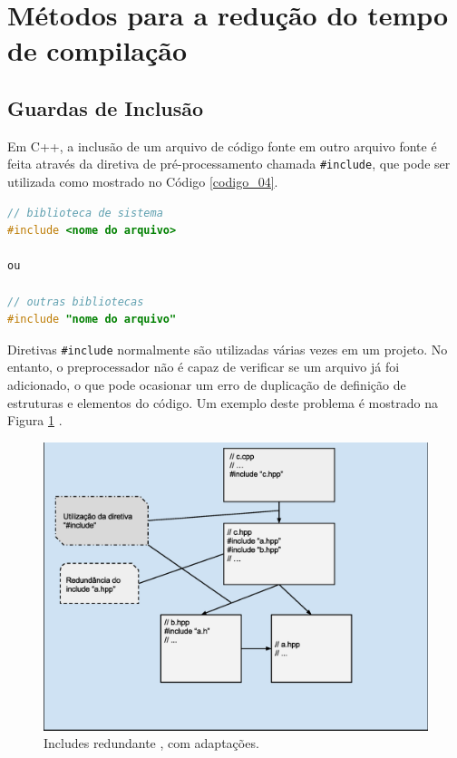 \section{Métodos para a redução do tempo de compilação}

\subsection{Guardas de Inclusão}\label{include_guards_section}

Em C++, a inclusão de um arquivo de código fonte em outro arquivo fonte é feita
 através da diretiva de pré-processamento chamada \texttt{\#include}, que pode 
ser utilizada como mostrado no Código \ref{codigo_04}. 

\begin{lstlisting}[language=C++,caption={Diretiva de 
                           pré-processamento para inclusão de arquivo},
                                                   label=codigo_04]
// biblioteca de sistema 
#include <nome do arquivo>  

ou

// outras bibliotecas 
#include "nome do arquivo"  

\end{lstlisting}


Diretivas \texttt{\#include} normalmente são utilizadas várias vezes em um projeto.
 No entanto, o preprocessador não é capaz de verificar se um arquivo já foi
 adicionado, o que pode ocasionar um erro de duplicação de definição de
 estruturas e elementos do código. Um exemplo deste problema é mostrado na
 Figura \ref{fig07} \cite[pág. 57]{ref39}.

\begin{figure}[h]
    \centering
        \includegraphics[keepaspectratio=true,scale=0.55]{figuras/multi_include.eps}
    \caption{Includes redundante \cite[pág.  80]{ref42}, com adaptações.}
    \label{fig07}
\end{figure}

